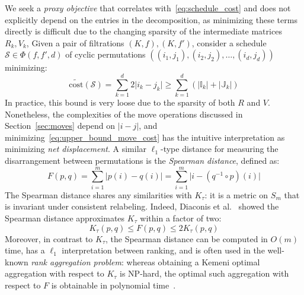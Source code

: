 \documentclass[sn-mathphys]{sn-jnl}
\begin{document}
We seek a \emph{proxy objective} that correlates with~\eqref{eq:schedule_cost} and does not explicitly depend on the entries in the decomposition, as minimizing these terms directly is difficult due to  the changing sparsity of the intermediate matrices $R_k, V_k$,  
Given a pair of filtrations $(K, f), (K,f')$, consider a schedule $\mathcal{S} \in \Phi(f,f',d)$ of cyclic permutations $((i_1, j_1), (i_2, j_2), \dots, (i_d, j_d))$ minimizing:
\begin{equation}\label{eq:upper_bound_move_cost}
\mathrm{\widetilde{cost}}(\mathcal{S}) = \sum\limits_{k=1}^d 2 \lvert i_k - j_k \rvert \geq \sum\limits_{k=1}^d ( \lvert \mathbb{I}_k \rvert + \lvert \mathbb{J}_k\rvert )
\end{equation}
In practice, this bound is very loose due to the sparsity of both $R$ and $V$. Nonetheless, the complexities of the move operations discussed in Section~\ref{sec:moves} depend on $\lvert i - j \rvert$, and minimizing~\eqref{eq:upper_bound_move_cost} has the intuitive interpretation as minimizing \emph{net displacement}. 
A similar $\ell_1$-type distance for measuring the disarrangement between permutations is the \emph{Spearman distance}, defined as:
\begin{equation}\label{eq:spearman_dist}
F(p, q) = \sum\limits_{i =1}^m \lvert p(i) - q(i) \rvert =  \sum\limits_{i =1}^m \lvert i - (q^{-1} \circ p)(i) \rvert
\end{equation}
The Spearman distance shares any similarities with $K_\tau$: it is a metric on $S_m$ that is invariant under consistent relabeling. 
Indeed, Diaconis et al.~\cite{diaconis1977spearman} showed the Spearman distance approximates $K_\tau$ within a factor of two: 
\begin{equation}\label{eq:diaconis_inequality}
K_\tau(p, q) \leq F(p, q) \leq 2 K_\tau(p, q)
\end{equation}
Moreover, in contrast to $K_\tau$, the Spearman distance can be computed in $O(m)$ time, has a $\ell_1$ interpretation between ranking, and is often used in the well-known \emph{rank aggregation problem}: whereas obtaining a Kemeni optimal aggregation with respect to $K_\tau$ is NP-hard, the optimal such aggregation with respect to $F$ is obtainable in polynomial time~\cite{dinu2006efficient}. 
\end{document}
